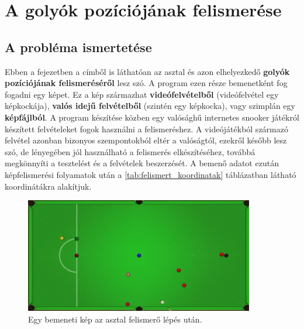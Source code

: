 \chapter{A golyók pozíciójának felismerése}
\section{A probléma ismertetése}
Ebben a fejezetben a címből is láthatóan az asztal és azon elhelyezkedő \textbf{golyók pozíciójának felismeréséről} lesz szó. A program ezen része bemenetként fog fogadni egy képet. Ez a kép származhat \textbf{videófelvételből} (videófelvétel egy képkockája), \textbf{valós idejű felvételből} (szintén egy képkocka), vagy szimplán egy \textbf{képfájlból}. A program készítése közben egy valósághű internetes snooker játékról\cite{flyordie} készített felvételeket fogok használni a felismeréshez. A videójátékból származó felvétel azonban bizonyos szempontokból eltér a valóságtól, ezekről később lesz szó, de lényegében jól használható a felismerés elkészítéséhez, továbbá megkönnyíti a tesztelést és a felvételek beszerzését. A bemenő adatot ezután képfelismerési folyamatok után a \ref{tab:felismert_koordinatak} táblázatban látható koordinátákra alakítjuk.

\begin{figure}[!ht]
    \centering
    \includegraphics[width=100mm, keepaspectratio]{figures/input_table.png}
    \caption{Egy bemeneti kép az asztal felismerő lépés után.}
    \label{fig:bemeneti_asztal}
\end{figure}

